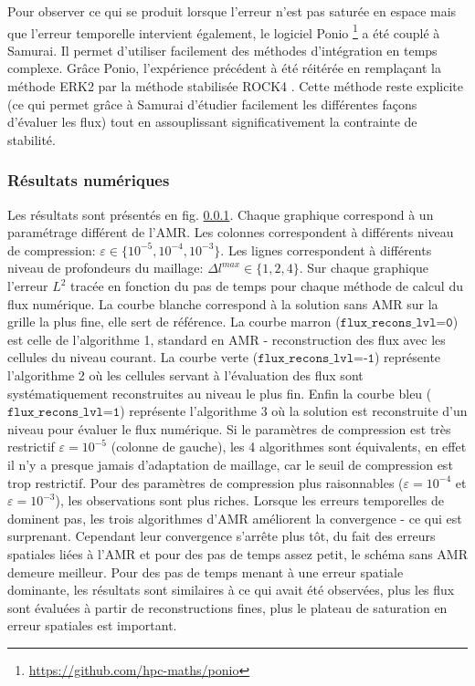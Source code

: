 Pour observer ce qui se produit lorsque l'erreur n'est pas saturée en espace mais que l'erreur temporelle intervient également, 
le logiciel Ponio \footnote{\href{https://github.com/hpc-maths/ponio}{https://github.com/hpc-maths/ponio}} a été couplé à Samurai.
Il permet d'utiliser facilement des méthodes d'intégration en temps complexe. 
Grâce Ponio, l’expérience précédent à été réitérée en remplaçant la méthode ERK2 par la méthode stabilisée ROCK4 \cite{AbdulleMedovikov2001}. 
Cette méthode reste explicite (ce qui permet grâce à Samurai d'étudier facilement les différentes façons d'évaluer les flux) 
tout en assouplissant significativement la contrainte de stabilité.
\subsubsection{Résultats numériques}
    Les résultats sont présentés en fig. \ref{}. Chaque graphique correspond à un paramétrage différent de l'AMR. 
    Les colonnes correspondent à différents niveau de compression: $\varepsilon \in \{10^{-5}, 10^{-4}, 10^{-3}\}$.
    Les lignes correspondent à différents niveau de profondeurs du maillage: $\Delta l^{max} \in \{1,2,4\}$.
    Sur chaque graphique l'erreur $L^2$ tracée en fonction du pas de temps pour chaque méthode de calcul du flux numérique.
    La courbe blanche correspond à la solution sans AMR sur la grille la plus fine, elle sert de référence.
    La courbe marron ($\texttt{flux\_recons\_lvl=0}$) est celle de l'algorithme 1, standard en AMR - reconstruction des flux avec les cellules du niveau courant.
    La courbe verte  ($\texttt{flux\_recons\_lvl=-1}$) représente l’algorithme 2 où les cellules servant à l'évaluation des flux sont systématiquement reconstruites au niveau le plus fin.
    Enfin la courbe bleu ($\texttt{flux\_recons\_lvl=1}$) représente l'algorithme 3 où la solution est reconstruite d'un niveau pour évaluer le flux numérique.
    Si le paramètres de compression est très restrictif $\varepsilon = 10^{-5}$ (colonne de gauche), les 4 algorithmes sont équivalents, en effet il n'y a presque jamais d'adaptation de maillage, car le seuil de compression est trop restrictif.
    Pour des paramètres de compression plus raisonnables ($\varepsilon = 10^{-4}$ et $\varepsilon = 10^{-3}$), les observations sont plus riches.
    Lorsque les erreurs temporelles de dominent pas, les trois algorithmes d'AMR améliorent la convergence - ce qui est surprenant. Cependant leur convergence s'arrête plus tôt, du fait des 
    erreurs spatiales liées à l'AMR et pour des pas de temps assez petit, le schéma sans AMR demeure meilleur.
    Pour des pas de temps menant à une erreur spatiale dominante, les résultats sont similaires à ce qui avait été observées, plus les flux sont évaluées à partir de reconstructions fines, 
    plus le plateau de saturation en erreur spatiales est important.
